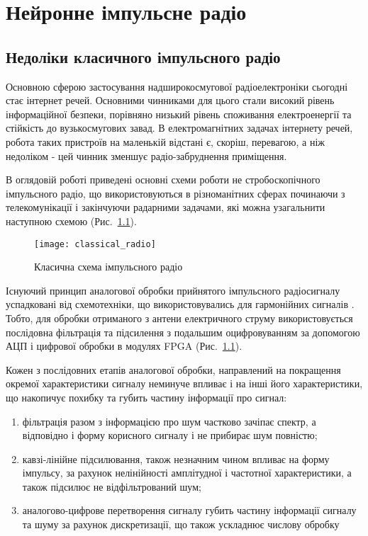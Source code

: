 \chapter{Нейронне імпульсне радіо}
\label{ch:neuron}

\section{Недоліки класичного імпульсного радіо}

Основною сферою застосування надширокосмугової радіоелектроніки сьогодні стає
інтернет речей. Основними чинниками для цього стали високий рівень 
інформаційної безпеки, порівняно низький рівень споживання електроенергії та
стійкість до вузькосмугових завад. В електромагнітних задачах інтернету речей,
робота таких пристроїв на маленькій відстані є, скоріш, перевагою, а ніж 
недоліком - цей чинник зменшує радіо-забруднення приміщення.

В оглядовій роботі \cite{imp:ChannelImplementation} приведені основні схеми
роботи не стробоскопічного імпульсного радіо, що використовуються в 
різноманітних сферах починаючи з телекомунікації і закінчуючи радарними 
задачами, які можна узагальнити наступною схемою (Рис.~\ref{fig:emp_radio}).

\begin{figure}[htbp] \begin{center}
\texttt{[image: classical\_radio]}
\caption{Класична схема імпульсного радіо} \label{fig:emp_radio}
\end{center} \end{figure}

Існуючий принцип аналогової обробки прийнятого імпульсного радіосигналу 
успадковані від схемотехніки, що використовувались для гармонійних сигналів 
\cite{imp:ComunicationsOverview}. Тобто, для обробки отриманого з антени 
електричного струму використовується послідовна фільтрація та підсилення з 
подальшим оцифровуванням за допомогою АЦП і цифрової обробки в модулях FPGA 
(Рис.~\ref{fig:emp_radio}).

Кожен з послідовних етапів аналогової обробки, направлений на покращення 
окремої характеристики сигналу неминуче впливає і на інші його характеристики,
що накопичує похибку та губить частину інформації про сигнал:

\begin{enumerate}
	\item фільтрація разом з інформацією про шум частково зачіпає спектр, 
	а відповідно і форму корисного сигналу і не прибирає шум повністю;
	\item кавзі-лінійне підсилювання, також незначним чином впливає на 
	форму імпульсу, за рахунок нелінійності амплітудної і частотної 
	характеристики, а також підсилює не відфільтрований шум;
	\item аналогово-цифрове перетворення сигналу губить частину інформації 
	сигналу та шуму за рахунок дискретизації, що також ускладнює числову 
	обробку
\end{enumerate}


